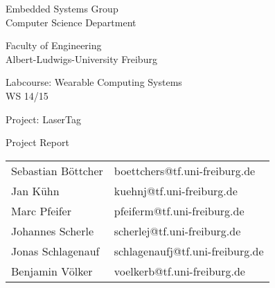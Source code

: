 

\pagestyle{empty}

\clearscrheadings\clearscrplain



\begin{center}
\begin{Huge}
Embedded Systems Group\\
\vspace{-2mm}
Computer Science Department\\
\vspace{3mm}
\end{Huge}{\Large Faculty of Engineering}\\
\vspace{3mm}
{\Large Albert-Ludwigs-University Freiburg}\\
\vspace{8mm}
\vspace{8mm}
\begin{Large}
Labcourse: Wearable Computing Systems\\
WS 14/15\\
\vspace{8mm}
\end{Large}
\begin{Huge}
Project: LaserTag\\
\vspace{8mm}
\end{Huge}
\begin{Large}
Project Report\\
\end{Large}
\vspace{50mm}
\begin{tabular}{ll}
Sebastian Böttcher &  boettchers@tf.uni-freiburg.de\\
Jan Kühn &  kuehnj@tf.uni-freiburg.de\\
Marc Pfeifer &  pfeiferm@tf.uni-freiburg.de\\
Johannes Scherle &  scherlej@tf.uni-freiburg.de\\
Jonas Schlagenauf &  schlagenaufj@tf.uni-freiburg.de\\
Benjamin Völker & voelkerb@tf.uni-freiburg.de \\
\end{tabular}


\end{center}
\thispagestyle{empty}
\clearpage


\pagestyle{useheadings} %
\renewcommand*{\chapterheadstartvskip}{\vspace{-2cm}}

\tableofcontents













